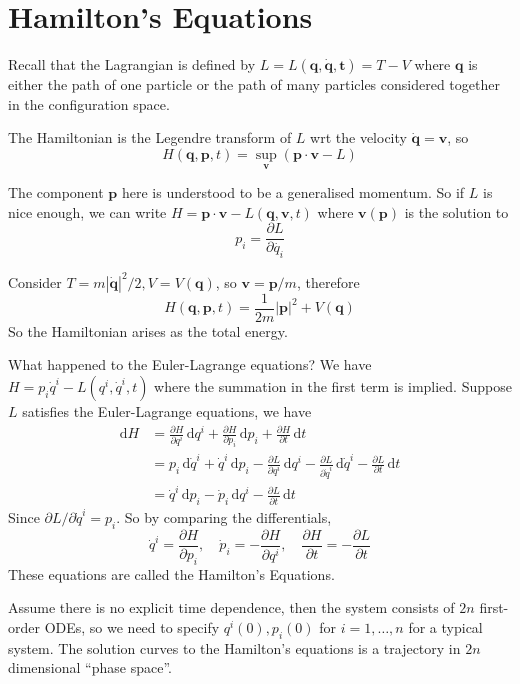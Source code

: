 \documentclass{article}
\begin{document}
\section{Hamilton's Equations}
Recall that the Lagrangian is defined by $L=L(\mathbf{q},\mathbf{\dot{q},t})=T-V$ where $\mathbf{q}$ is either the path of one particle or the path of many particles considered together in the configuration space.
\begin{definition}
    The Hamiltonian is the Legendre transform of $L$ wrt the velocity $\mathbf{\dot{q}}=\mathbf{v}$, so
    $$H(\mathbf{q},\mathbf{p},t)=\sup_{\mathbf{v}}(\mathbf{p}\cdot\mathbf{v}-L)$$
\end{definition}
The component $\mathbf{p}$ here is understood to be a generalised momentum.
So if $L$ is nice enough, we can write $H=\mathbf{p}\cdot\mathbf{v}-L(\mathbf{q},\mathbf{v},t)$ where $\mathbf{v}(\mathbf{p})$ is the solution to
$$p_i=\frac{\partial L}{\partial \dot{q_i}}$$
\begin{example}
    Consider $T=m|\mathbf{\dot{q}}|^2/2, V=V(\mathbf{q})$, so $\mathbf{v}=\mathbf{p}/m$, therefore
    $$H(\mathbf{q},\mathbf{p},t)=\frac{1}{2m}|\mathbf{p}|^2+V(\mathbf{q})$$
    So the Hamiltonian arises as the total energy.
\end{example}
What happened to the Euler-Lagrange equations?
We have $H=p_i\dot{q}^i-L(q^i,\dot{q}^i,t)$ where the summation in the first term is implied.
Suppose $L$ satisfies the Euler-Lagrange equations, we have
\begin{align*}
    \mathrm dH&=\frac{\partial H}{\partial q^i}\,\mathrm dq^i+\frac{\partial H}{\partial p_i}\,\mathrm dp_i+\frac{\partial H}{\partial t}\,\mathrm dt\\
    &=p_i\,\mathrm d\dot{q}^i+\dot{q}^i\,\mathrm dp_i-\frac{\partial L}{\partial q^i}\,\mathrm dq^i-\frac{\partial L}{\partial \dot{q}^i}\,\mathrm d\dot{q}^i-\frac{\partial L}{\partial t}\,\mathrm dt\\
    &=\dot{q}^i\,\mathrm dp_i-\dot{p}_i\,\mathrm dq^i-\frac{\partial L}{\partial t}\,\mathrm dt
\end{align*}
Since $\partial L/\partial \dot{q}^i=p_i$.
So by comparing the differentials,
$$\dot{q}^i=\frac{\partial H}{\partial p_i},\quad\dot{p}_i=-\frac{\partial H}{\partial q^i},\quad\frac{\partial H}{\partial t}=-\frac{\partial L}{\partial t}$$
These equations are called the Hamilton's Equations.

Assume there is no explicit time dependence, then the system consists of $2n$ first-order ODEs, so we need to specify $q^i(0),p_i(0)$ for $i=1,\ldots,n$ for a typical system.
The solution curves to the Hamilton's equations is a trajectory in $2n$ dimensional ``phase space''.
\end{document}
